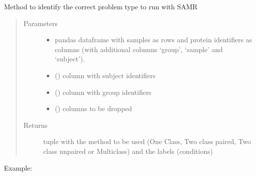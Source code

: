 \documentclass[letterpaper,10pt,english]{sphinxmanual}
\begin{document}
\begin{fulllineitems}
\label{\detokenize{_autosummary/analytics_core.analytics:analytics_core.analytics.analytics.define_samr_method}}
Method to identify the correct problem type to run with SAMR
\begin{quote}\begin{description}
\item[{Parameters}] \leavevmode\begin{itemize}
\item {} 
 \textendash{} pandas dataframe with samples as rows and protein identifiers as columns (with additional columns ‘group’, ‘sample’ and ‘subject’).

\item {} 
 () \textendash{} column with subject identifiers

\item {} 
 () \textendash{} column with group identifiers

\item {} 
 () \textendash{} columns to be dropped

\end{itemize}

\item[{Returns}] \leavevmode
tuple with the method to be used (One Class, Two class paired, Two class unpaired or Multiclass) and the labels (conditions)

\end{description}\end{quote}

Example:

\begin{sphinxVerbatim}[commandchars=\\\{\}]
     
\end{sphinxVerbatim}

\end{fulllineitems}
\end{document}
